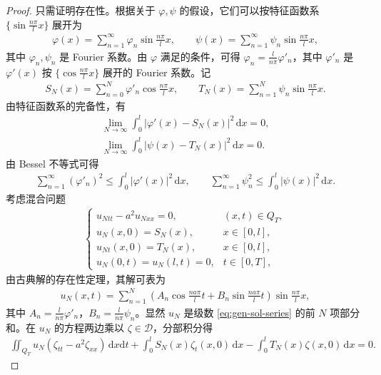 \documentclass[../../main.tex]{subfiles}%
\begin{document}
\begin{proof}
只需证明存在性。根据关于 $\varphi,\psi$ 的假设，它们可以按特征函数系 $\{\sin\frac{n\pi}{l}x\}$ 展开为
\begin{align*}
\varphi(x)=\sum_{n=1}^{\infty}\varphi_n\sin\frac{n\pi}{l}x,\qquad
\psi(x)=\sum_{n=1}^{\infty}\psi_n\sin\frac{n\pi}{l}x,
\end{align*}
其中 $\varphi_n,\psi_n$ 是 Fourier 系数。由 $\varphi$ 满足的条件，可得 $\varphi_n=\frac{l}{n\pi}\varphi'_n$，其中 $\varphi'_n$ 是 $\varphi'(x)$ 按 $\{\cos\frac{n\pi}{l}x\}$ 展开的 Fourier 系数。记
\begin{align*}
S_N(x)=\sum_{n=0}^{N}\varphi'_n\cos\frac{n\pi}{l}x,\qquad
T_N(x)=\sum_{n=1}^{N}\psi_n\sin\frac{n\pi}{l}x.
\end{align*}
由特征函数系的完备性，有
\begin{align}
\lim_{N\to\infty}\int_0^l|\varphi'(x)-S_N(x)|^2\,\mathrm{d}x=0, \label{eq:phi-approx}\\
\lim_{N\to\infty}\int_0^l|\psi(x)-T_N(x)|^2\,\mathrm{d}x=0. \label{eq:psi-approx}
\end{align}
由 Bessel 不等式可得
\begin{align}
\sum_{n=1}^{\infty}(\varphi'_n)^2\leqslant \int_0^l|\varphi'(x)|^2\,\mathrm{d}x,\qquad
\sum_{n=1}^{\infty}\psi_n^2\leqslant \int_0^l|\psi(x)|^2\,\mathrm{d}x. \label{eq:bessel}
\end{align}
考虑混合问题
\begin{align*}
\begin{cases}
u_{Ntt}-a^2u_{Nxx}=0, & (x,t)\in Q_T, \\
u_N(x,0)=S_N(x), & x\in[0,l], \\
u_{Nt}(x,0)=T_N(x), & x\in[0,l], \\
u_N(0,t)=u_N(l,t)=0, & t\in[0,T],
\end{cases}
\end{align*}
由古典解的存在性定理，其解可表为
\begin{align*}
u_N(x,t)=\sum_{n=1}^{N}\left(A_n\cos\frac{na\pi}{l}t+B_n\sin\frac{na\pi}{l}t\right)\sin\frac{n\pi}{l}x,
\end{align*}
其中 $A_n=\frac{l}{n\pi}\varphi'_n$，$B_n=\frac{l}{n\pi}\psi_n$。显然 $u_N$ 是级数 \eqref{eq:gen-sol-series} 的前 $N$ 项部分和。在 $u_N$ 的方程两边乘以 $\zeta\in\mathcal{D}$，分部积分得
\begin{align}
\iint_{Q_T}u_N(\zeta_{tt}-a^2\zeta_{xx})\,\mathrm{d}x\mathrm{d}t+\int_0^l S_N(x)\zeta_t(x,0)\,\mathrm{d}x-\int_0^l T_N(x)\zeta(x,0)\,\mathrm{d}x=0. \label{eq:weak-N}
\end{align}

\end{proof}
\end{document}
